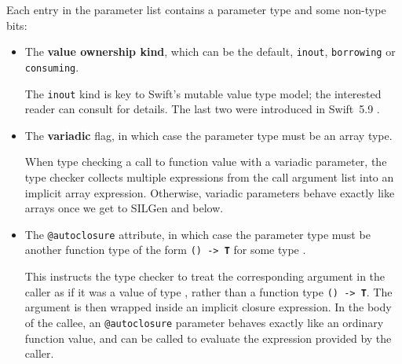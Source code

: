\documentclass[../generics]{subfiles}
\begin{document}
Each entry in the parameter list contains a parameter type and some non-type bits:
\begin{itemize}
\item The \textbf{value ownership kind}, which can be the default, \texttt{inout}, \texttt{borrowing} or \texttt{consuming}.

The \texttt{inout} kind is key to Swift's mutable value type model; the interested reader can consult \cite{valuesemantics} for details. The last two were introduced in Swift~5.9 \cite{se0377}.

\item The \textbf{variadic} flag, in which case the parameter type must be an array type.

When type checking a call to function value with a variadic parameter, the type checker collects multiple expressions from the call argument list into an implicit array expression. Otherwise, variadic parameters behave exactly like arrays once we get to SILGen and below.
\item The \texttt{@autoclosure} attribute, in which case the parameter type must be another function type of the form \texttt{() -> \textbf{T}} for some type .

This instructs the type checker to treat the corresponding argument in the caller as if it was a value of type , rather than a function type \texttt{()~->~\textbf{T}}. The argument is then wrapped inside an implicit closure expression. In the body of the callee, an \texttt{@autoclosure} parameter behaves exactly like an ordinary function value, and can be called to evaluate the expression provided by the caller.
\end{itemize}
\end{document}
